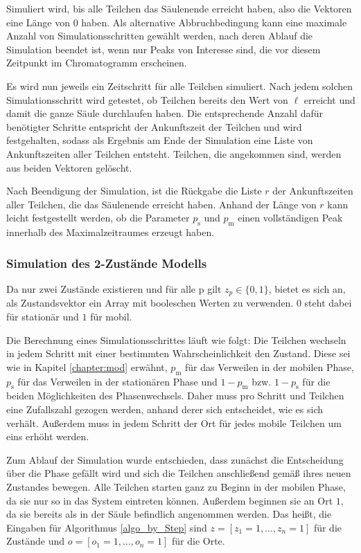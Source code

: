 Simuliert wird, bis alle Teilchen das Säulenende erreicht haben, also die Vektoren eine Länge von $0$ haben. 
Als alternative Abbruchbedingung kann eine maximale Anzahl von Simulationsschritten gewählt werden, nach deren Ablauf die Simulation beendet ist, wenn nur Peaks von Interesse sind, die vor diesem Zeitpunkt im Chromatogramm erscheinen.

Es wird nun jeweils ein Zeitschritt für alle Teilchen simuliert. Nach jedem solchen Simulationsschritt wird getestet, ob Teilchen bereits den Wert von $\ell$ erreicht und damit die ganze Säule durchlaufen haben. Die entsprechende Anzahl dafür benötigter Schritte entspricht der Ankunftszeit der Teilchen und wird festgehalten, sodass als Ergebnis am Ende der Simulation eine Liste von Ankunftszeiten aller Teilchen entsteht. Teilchen, die angekommen sind, werden aus beiden Vektoren gelöscht.

Nach Beendigung der Simulation, ist die Rückgabe die Liste $r$ der Ankunftszeiten aller Teilchen, die das Säulenende erreicht haben. Anhand der Länge von $r$ kann leicht festgestellt werden, ob die Parameter $p_{\text{s}}$ und $p_{\text{m}}$ einen vollständigen Peak innerhalb des Maximalzeitraumes erzeugt haben. 


\subsubsection{Simulation des 2-Zustände Modells}

Da nur zwei Zustände existieren und für alle p gilt $z_p \in \{0,1\}$, bietet es sich an, als Zustandsvektor ein Array mit booleschen Werten zu verwenden. $0$ steht dabei für stationär und $1$ für mobil.

Die Berechnung eines Simulationsschrittes läuft wie folgt: Die Teilchen wechseln in jedem Schritt mit einer bestimmten Wahrscheinlichkeit den Zustand. Diese sei wie in Kapitel \ref{chapter:mod} erwähnt, $p_{\text{m}}$ für das Verweilen in der mobilen Phase, $p_{\text{s}}$ für das Verweilen in der stationären Phase und $1-p_{\text{m}}$ bzw. $1-p_{\text{s}}$ für die beiden Möglichkeiten des Phasenwechsels. Daher muss pro Schritt und Teilchen eine Zufallszahl gezogen werden, anhand derer sich entscheidet, wie es sich verhält. Außerdem muss in jedem Schritt der Ort für jedes mobile Teilchen um eins erhöht werden.

Zum Ablauf der Simulation wurde entschieden, dass zunächst die Entscheidung über die Phase gefällt wird und sich die Teilchen anschließend gemäß ihres neuen Zustandes bewegen. Alle Teilchen starten ganz zu Beginn in der mobilen Phase, da sie nur so in das System eintreten können. Außerdem beginnen sie an Ort $1$, da sie bereits als in der Säule befindlich angenommen werden. Das heißt, die Eingaben für Algorithmus \ref{algo_by_Step} sind $z= [z_1 = 1, \ldots, z_n=1]$ für die Zustände und $o= [o_1 = 1, \ldots, o_n=1]$ für die Orte.

